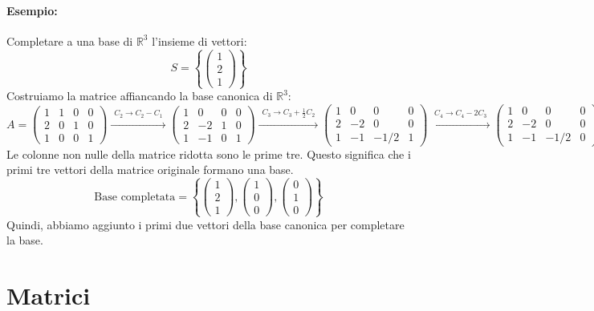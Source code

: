 \documentclass{article}
\begin{document}
\paragraph{Esempio:} Completare a una base di $\mathbb{R}^3$ l'insieme di vettori:
\[ S = \left\{ \begin{pmatrix} 1 \\ 2 \\ 1 \end{pmatrix} \right\} \]
Costruiamo la matrice affiancando la base canonica di $\mathbb{R}^3$:
\[
A = \begin{pmatrix}
1 & 1 & 0 & 0 \\
2 & 0 & 1 & 0 \\
1 & 0 & 0 & 1
\end{pmatrix}
\xrightarrow{\substack{C_2 \to C_2 - C_1}}
\begin{pmatrix}
1 & 0 & 0 & 0 \\
2 & -2 & 1 & 0 \\
1 & -1 & 0 & 1
\end{pmatrix}
\xrightarrow{\substack{C_3 \to C_3 + \frac{1}{2}C_2}}
\begin{pmatrix}
1 & 0 & 0 & 0 \\
2 & -2 & 0 & 0 \\
1 & -1 & -1/2 & 1
\end{pmatrix}
\xrightarrow{\substack{C_4 \to C_4 - 2C_3}}
\begin{pmatrix}
1 & 0 & 0 & 0 \\
2 & -2 & 0 & 0 \\
1 & -1 & -1/2 & 0
\end{pmatrix}
\]
Le colonne non nulle della matrice ridotta sono le prime tre. Questo significa che i primi tre vettori della matrice originale formano una base.
\[ \text{Base completata} = \left\{ \begin{pmatrix} 1 \\ 2 \\ 1 \end{pmatrix}, \begin{pmatrix} 1 \\ 0 \\ 0 \end{pmatrix}, \begin{pmatrix} 0 \\ 1 \\ 0 \end{pmatrix} \right\} \]
Quindi, abbiamo aggiunto i primi due vettori della base canonica per completare la base.

\section{Matrici}
\end{document}
